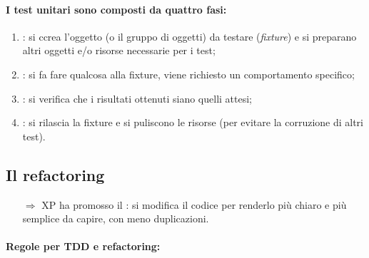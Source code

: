 \paragraph{I test unitari sono composti da quattro fasi:}

\begin{enumerate}
    \item {}: si ccrea l'oggetto (o il gruppo di
    oggetti) da testare (\textit{fixture}) e si preparano altri oggetti e/o risorse necessarie per i test;
    \item {}: si fa fare qualcosa alla fixture, viene richiesto un comportamento specifico;
    \item {}: si verifica che i risultati ottenuti siano 
    quelli attesi;
    \item {}: si rilascia la fixture e si puliscono le risorse (per evitare la corruzione di altri test).
\end{enumerate}

\subsection{Il refactoring}


\begin{itemize}
    \item [$\Rightarrow$] XP ha promosso il :
    si modifica il codice per renderlo più chiaro e più semplice da capire,
    con meno duplicazioni.
\end{itemize}



\paragraph{Regole per TDD e refactoring:}

